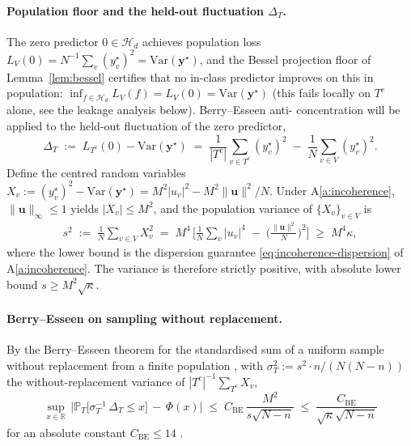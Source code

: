 \documentclass[11pt,a4paper]{article}
\theoremstyle{plain}
\theoremstyle{definition}
\theoremstyle{remark}
\newcommand{\by}{\mathbf{y}}
\newcommand{\bu}{\mathbf{u}}
\newcommand{\R}{\mathbb{R}}
\newcommand{\PR}{\mathbb{P}}
\newcommand{\Var}{\mathrm{Var}}
\newcommand{\Hcal}{\mathcal{H}}
\begin{document}
\paragraph{Population floor and the held-out fluctuation $\Delta_T$.}

The zero predictor $0 \in \Hcal_d$ achieves population loss
$L_V(0) = N^{-1}\sum_v (y^\star_v)^2 = \Var(\by^\star)$, and the
Bessel projection floor of Lemma~\ref{lem:bessel} certifies that no
in-class predictor improves on this in population: $\inf_{f \in
\Hcal_d} L_V(f) = L_V(0) = \Var(\by^\star)$ (this fails locally on
$T^c$ alone, see the leakage analysis below). Berry--Esseen anti-%
concentration will be applied to the held-out fluctuation of the
zero predictor,
\[
    \Delta_T \;:=\; L_{T^c}(0) - \Var(\by^\star)
    \;=\; \frac{1}{|T^c|}\sum_{v \in T^c}(y^\star_v)^2
        \;-\; \frac{1}{N}\sum_{v \in V}(y^\star_v)^2.
\]
Define the centred random variables $X_v := (y^\star_v)^2 -
\Var(\by^\star) = M^2 |u_v|^2 - M^2 \|\bu\|^2/N$. Under
A\ref{a:incoherence}, $\|\bu\|_\infty \le 1$ yields $|X_v| \le
M^2$, and the population variance of $\{X_v\}_{v \in V}$ is
\begin{align}
    s^2 \;:=\; \frac{1}{N}\sum_{v \in V} X_v^2
    \;=\; M^4 \,\bigg[
        \frac{1}{N}\sum_v |u_v|^4
        \;-\; \Big(\frac{\|\bu\|^2}{N}\Big)^{\!2}
    \bigg]
    \;\ge\; M^4 \kappa,
    \label{eq:minimax-popvar}
\end{align}
where the lower bound is the dispersion guarantee
\eqref{eq:incoherence-dispersion} of A\ref{a:incoherence}. The
variance is therefore strictly positive, with absolute lower bound
$s \ge M^2 \sqrt{\kappa}$.

\paragraph{Berry--Esseen on sampling without replacement.}

By the Berry--Esseen theorem for the standardised sum of a uniform
sample without replacement from a finite population
\citep{Bikelis1969,Bentkus2003}, with $\sigma^2_T := s^2 \cdot n /
(N (N-n))$ the without-replacement variance of
$|T^c|^{-1}\sum_{T^c} X_v$,
\[
    \sup_{x \in \R}\,\bigg|
        \PR_T\!\Big[\sigma_T^{-1}\, \Delta_T \le x\Big]
        \,-\, \Phi(x)
    \bigg|
    \;\le\; C_{\mathrm{BE}}\,\frac{M^2}{s\sqrt{N-n}}
    \;\le\; \frac{C_{\mathrm{BE}}}{\sqrt{\kappa}\sqrt{N-n}}
\]
for an absolute constant $C_{\mathrm{BE}} \le 14$
\citep[][Cor.~1.2]{Bentkus2003}.
\end{document}
